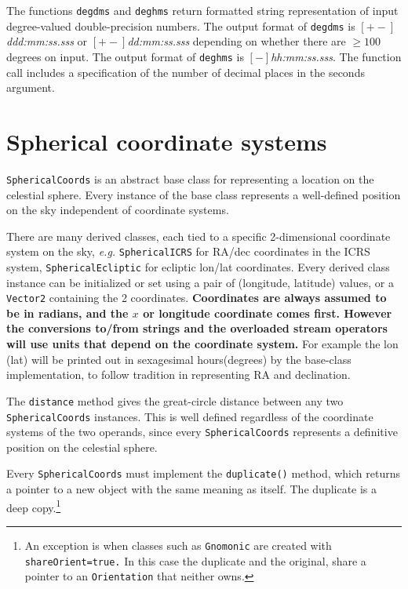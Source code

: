 \documentclass[11pt,preprint,flushrt]{aastex}
\begin{document}
The functions {\tt degdms} and {\tt deghms} return formatted string representation of input degree-valued double-precision numbers.  The output format of {\tt degdms}  is {\it $[+-]$ddd:mm:ss.sss} or {\it $[+-]$dd:mm:ss.sss} depending on whether there are $\ge100$ degrees on input. The output format of {\tt deghms}  is {\it $[-]$hh:mm:ss.sss}.  The function call includes a specification of the number of decimal places in the seconds argument.

\section{Spherical coordinate systems}
{\tt SphericalCoords} is an abstract base class for representing a location on the celestial sphere.  Every instance of the base class represents a well-defined position on the sky independent of coordinate systems.

There are many derived classes, each tied to a specific 2-dimensional coordinate system on the sky, {\it e.g.} {\tt SphericalICRS} for RA/dec coordinates in the ICRS system, {\tt SphericalEcliptic} for ecliptic lon/lat coordinates.  Every derived class instance can be initialized or set using a pair of (longitude, latitude) values, or a {\tt Vector2} containing the 2 coordinates.  {\bf Coordinates are always assumed to be in radians, and the $x$ or longitude coordinate comes first.  However the conversions to/from strings and the overloaded stream operators will use units that depend on the coordinate system.}  For example the lon (lat) will be printed out in sexagesimal hours(degrees) by the base-class implementation, to follow tradition in representing RA and declination.

The {\tt distance} method gives the great-circle distance between any two {\tt SphericalCoords} instances.  This is well defined regardless of the coordinate systems of the two operands, since every {\tt SphericalCoords} represents a definitive position on the celestial sphere.

Every {\tt SphericalCoords} must implement the {\tt duplicate()} method, which returns a pointer to a new object with the same meaning as itself.  The duplicate is a deep copy.\footnote{An exception is when classes such as {\tt Gnomonic} are created with {\tt shareOrient=true.}  In this case the duplicate and the original, share a pointer to an {\tt Orientation} that neither owns.}
\end{document}
